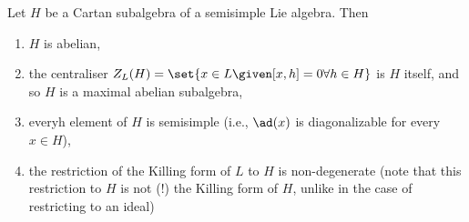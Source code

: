 Let $H$ be a Cartan subalgebra of a semisimple Lie algebra. Then
\begin{enumerate}[label=(\alph*)]
	\item $H$ is abelian,
	\item the centraliser $Z_L(H) = \set{x \in L\given [x, h] = 0 \forall h \in H}$
		is $H$ itself, and so $H$ is a maximal abelian subalgebra,
	\item everyh element of $H$ is semisimple (i.e., $\ad(x)$ is diagonalizable for
		every $x \in H$),
	\item the restriction of the Killing form of $L$ to $H$ is non-degenerate
		(note that this restriction to $H$ is not (!) the Killing form of $H$, unlike
		in the case of restricting to an ideal)
\end{enumerate}
